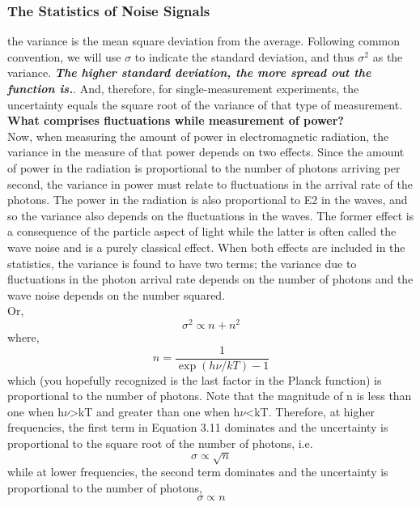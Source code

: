 \documentclass[10pt]{report}
\newcommand{\cc}[1]{\left({#1}\right)}
\begin{document}
 \subsubsection{The Statistics of Noise Signals}
 the variance is the mean square deviation from the average.  Following common convention, we will use $\sigma$ to indicate the standard deviation, and thus $\sigma^2$ as the variance. \textbf{\textit{The higher standard deviation, the more spread out the function is.}}.  And, therefore, for single-measurement experiments, the uncertainty equals the square root of the variance of that type of measurement.\\
 \textbf{What comprises fluctuations while measurement of power?}\\
   Now, when measuring the amount of power in electromagnetic radiation, the variance in the measure of that power depends on two effects.  Since the amount of power in the radiation is proportional to the number of photons arriving per second, the variance in power must relate to fluctuations in the arrival rate of the photons.  The power in the radiation is also proportional to E2 in the waves, and so the variance also depends on the fluctuations in the waves.  The former effect is a consequence of the particle aspect of light while the latter is often called the wave noise and is a purely classical effect.  When both effects are included in the statistics, the variance is found to have two terms; the variance due to fluctuations in the photon arrival rate depends on the number of photons and the wave noise depends on the number squared. \\
Or,
\begin{equation}\label{eqstat}
\sigma^2\propto n+n^2
\end{equation}
where,
\begin{equation*}
n=\frac{1}{\exp\cc{h\nu/kT}-1}
\end{equation*}
which (you hopefully recognized is the last factor in the Planck function) is proportional to the number of photons.  Note that the magnitude of n is less than one when h$\nu$>kT and greater than one when h$\nu$<kT.  Therefore, at higher frequencies, the first term in Equation 3.11 dominates and the uncertainty is proportional to the square root of the number of photons, i.e.
\begin{equation}
\sigma \propto \sqrt{n}
\end{equation}
while at lower frequencies, the second term dominates and the uncertainty is proportional to the number of photons,
\begin{equation}
\sigma \propto n
\end{equation}
\end{document}

